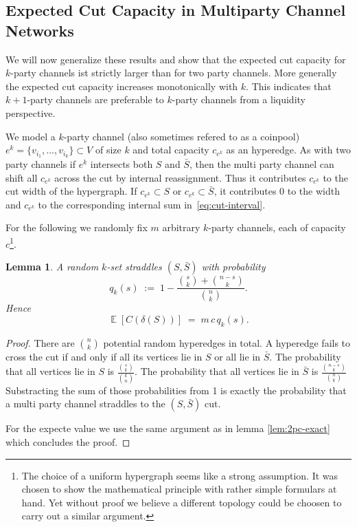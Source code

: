 \documentclass[10pt,twocolumn]{article}
\newtheorem{lemma}[theorem]{Lemma}
\DeclareMathOperator{\EE}{\mathbb{E}}
\begin{document}
\subsection{Expected Cut Capacity in Multiparty Channel Networks}
\label{subsec:hyperedge-cut}

We will now generalize these results and show that the expected cut capacity for $k$-party channels ist strictly larger than for two party channels. More generally the expected cut capacity increases monotonically with $k$.
This indicates that $k+1$-party channels are preferable to $k$-party channels from a liquidity perspective. 

We model a $k$-party channel (also sometimes refered to as a coinpool) $e^k = \{v_{i_1},\dots,v_{i_k}\}\subset V$ of size $k$ and total capacity $c_{e^k}$ as an hyperedge.
As with two party channels if $e^k$ intersects both $S$ and $\bar S$, then the multi party channel can shift all $c_{e^k}$ across the cut by internal reassignment.
Thus it contributes $c_{e^k}$ to the cut width of the hypergraph.
If $c_{e^k}\subset S$ or $c_{e^k}\subset\bar S$, it contributes $0$ to the width and $c_{e^k}$
to the corresponding internal sum in~\eqref{eq:cut-interval}.

For the following we randomly fix $m$ arbitrary $k$-party channels, each of capacity $c$\footnote{The choice of a uniform hypergraph seems like a strong assumption. It was chosen to show the mathematical principle with rather simple formulars at hand. Yet without proof we believe a different topology could be choosen to carry out a similar argument.}.



\begin{lemma}
\label{lem:kpc-exact}
A random $k$-set straddles $(S,\bar S)$ with probability
\[
q_k(s) \;:=\; 1 - \frac{\binom{s}{k}+\binom{n-s}{k}}{\binom{n}{k}}.
\]
Hence
\[
\EE[C(\delta(S))] \;=\; m\,c\, q_k(s).
\]
\end{lemma}

\begin{proof}
  There are $\binom{n}{k}$ potential random hyperedges in total. 
  A hyperedge fails to cross the cut if and only if all its vertices lie in $S$ or all lie in $\bar S$.
  The probability that all vertices lie in $S$ is $\frac{\binom{s}{k}}{\binom{k}{n}}$. The probability that all vertices lie in $\bar S$ is $\frac{\binom{n-s}{k}}{\binom{n}{k}}$
  Substracting the sum of those probabilities from 1 is exactly the probability that a multi party channel straddles to the $(S,\bar S)$ cut.

  For the expecte value we use the same argument as in lemma \ref{lem:2pc-exact}
which concludes the proof.
\end{proof}
\end{document}
